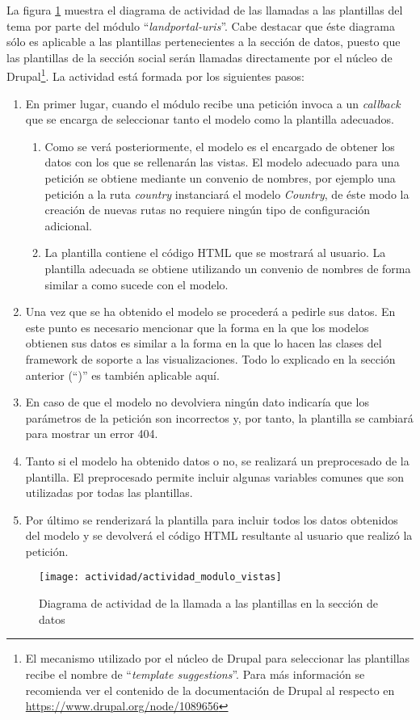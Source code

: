 La figura \ref{fig:diagrama_actividad_vistas} muestra el diagrama de actividad de las llamadas a las plantillas del tema por parte del módulo ``\textit{landportal-uris}''.  Cabe destacar que éste diagrama sólo es aplicable a las plantillas pertenecientes a la sección de datos, puesto que las plantillas de la sección social serán llamadas directamente por el núcleo de Drupal\footnote{El mecanismo utilizado por el núcleo de Drupal para seleccionar las plantillas recibe el nombre de ``\textit{template suggestions}''.  Para más información se recomienda ver el contenido de la documentación de Drupal al respecto en \url{https://www.drupal.org/node/1089656}}.  La actividad está formada por los siguientes pasos:
\begin{enumerate}
	\item  En primer lugar, cuando el módulo recibe una petición invoca a un \textit{callback} que se encarga de seleccionar tanto el modelo como la plantilla adecuados.
		\begin{enumerate}
			\item  Como se verá posteriormente, el modelo es el encargado de obtener los datos con los que se rellenarán las vistas.  El modelo adecuado para una petición se obtiene mediante un convenio de nombres, por ejemplo una petición a la ruta \textit{country} instanciará el modelo \textit{Country}, de éste modo la creación de nuevas rutas no requiere ningún tipo de configuración adicional.
			\item  La plantilla contiene el código HTML que se mostrará al usuario.  La plantilla adecuada se obtiene utilizando un convenio de nombres de forma similar a como sucede con el modelo.
		\end{enumerate}
	\item  Una vez que se ha obtenido el modelo se procederá a pedirle sus datos.  En este punto es necesario mencionar que la forma en la que los modelos obtienen sus datos es similar a la forma en la que lo hacen las clases del framework de soporte a las visualizaciones.  Todo lo explicado en la sección anterior (``)'' es también aplicable aquí.
	\item  En caso de que el modelo no devolviera ningún dato indicaría que los parámetros de la petición son incorrectos y, por tanto, la plantilla se cambiará para mostrar un error 404.
	\item  Tanto si el modelo ha obtenido datos o no, se realizará un preprocesado de la plantilla.  El preprocesado permite incluir algunas variables comunes que son utilizadas por todas las plantillas.
	\item  Por último se renderizará la plantilla para incluir todos los datos obtenidos del modelo y se devolverá el código HTML resultante al usuario que realizó la petición.
\end{enumerate}

\begin{figure}[h]
	\centering
	\texttt{[image: actividad/actividad\_modulo\_vistas]}
	\caption{Diagrama de actividad de la llamada a las plantillas en la sección de datos}
	\label{fig:diagrama_actividad_vistas}
\end{figure}